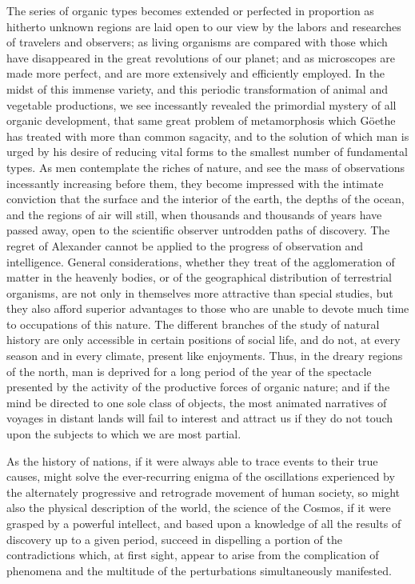The series of organic types becomes extended or perfected in proportion as hitherto unknown regions are laid open to our view by the labors and researches of travelers and observers; as living organisms are compared with those which have disappeared in the great revolutions of our planet; and as microscopes are made more perfect, and are more extensively and efficiently employed. In the midst of this immense variety, and this periodic transformation of animal and vegetable productions, we see incessantly revealed the primordial mystery of all organic development, that same great problem of metamorphosis which G\"oethe has treated with more than common sagacity, and to the solution of which man is urged by his desire of reducing vital forms to the smallest number of fundamental types. As men contemplate the riches of nature, and see the mass of observations incessantly increasing before them, they become impressed with the intimate conviction that the surface and the interior of the earth, the depths of the ocean, and the regions of air will still, when thousands and thousands of years have passed away, open to the scientific observer untrodden paths of discovery. The regret of Alexander cannot be applied to the progress of observation and intelligence. General considerations, whether they treat of the agglomeration of matter in the heavenly bodies, or of the geographical distribution of terrestrial organisms, are not only in themselves more attractive than special studies, but they also afford superior advantages to those who are unable to devote much time to occupations of this nature. The different branches of the study of natural history are only accessible in certain positions of social life, and do not, at every season and in every climate, present like enjoyments. Thus, in the dreary regions of the north, man is deprived for a long period of the year of the spectacle presented by the activity of the productive forces of organic nature; and if the mind be directed to one sole class of objects, the most animated narratives of voyages in distant lands will fail to interest and attract us if they do not touch upon the subjects to which we are most partial.

As the history of nations, if it were always able to trace events to their true causes, might solve the ever-recurring enigma of the oscillations experienced by the alternately progressive and retrograde movement of human society, so might also the physical description of the world, the science of the Cosmos, if it were grasped by a powerful intellect, and based upon a knowledge of all the results of discovery up to a given period, succeed in dispelling a portion of the contradictions which, at first sight, appear to arise from the complication of phenomena and the multitude of the perturbations simultaneously manifested.

